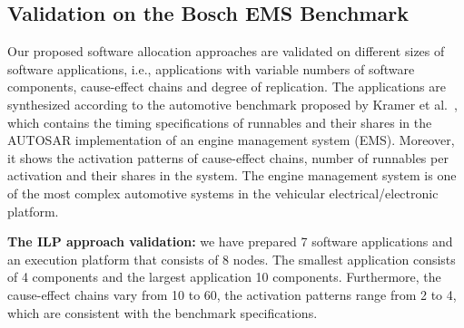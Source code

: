 \subsection*{Validation on the Bosch EMS Benchmark}
Our proposed software allocation approaches are validated on different sizes of software applications, i.e., applications with variable numbers of software components, cause-effect chains and degree of replication. The applications are synthesized according to the automotive benchmark proposed by Kramer et al.~\cite{Kramer2015RealFree}, which contains the timing specifications of runnables and their shares in the AUTOSAR implementation of an engine management system (EMS). Moreover, it shows the activation patterns of cause-effect chains, number of runnables per activation and their shares in the system. The engine management system is one of the most complex automotive systems in the vehicular electrical/electronic platform. 

\noindent\textbf{The ILP approach validation: }we have prepared 7 software applications and an execution platform that consists of 8 nodes. The smallest application consists of 4 components and the largest application 10 components. Furthermore, the cause-effect chains vary from 10 to 60, the activation patterns range from 2 to 4, which are consistent with the benchmark specifications.
    
